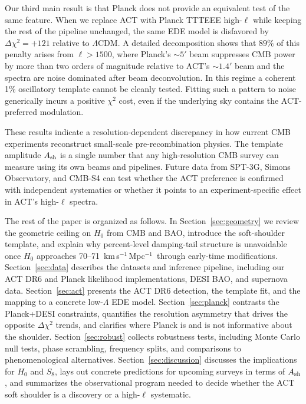 \documentclass[twocolumn,showpacs,preprintnumbers,amsmath,amssymb,prd]{revtex4-2}
\newcommand{\lcdm}{$\Lambda$CDM}
\newcommand{\kms}{km\,s$^{-1}$\,Mpc$^{-1}$}
\begin{document}
Our third main result is that Planck does not provide an equivalent test of the same feature. When we replace ACT with Planck TTTEEE high-$\ell$ while keeping the rest of the pipeline unchanged, the same EDE model is disfavored by $\Delta\chi^2 = +121$ relative to \lcdm. A detailed decomposition shows that $89\%$ of this penalty arises from $\ell > 1500$, where Planck's $\sim 5'$ beam suppresses CMB power by more than two orders of magnitude relative to ACT's $\sim 1.4'$ beam and the spectra are noise dominated after beam deconvolution. In this regime a coherent 1\% oscillatory template cannot be cleanly tested. Fitting such a pattern to noise generically incurs a positive $\chi^2$ cost, even if the underlying sky contains the ACT-preferred modulation.

These results indicate a resolution-dependent discrepancy in how current CMB experiments reconstruct small-scale pre-recombination physics. The template amplitude $A_{\rm sh}$ is a single number that any high-resolution CMB survey can measure using its own beams and pipelines. Future data from SPT-3G, Simons Observatory, and CMB-S4 can test whether the ACT preference is confirmed with independent systematics or whether it points to an experiment-specific effect in ACT's high-$\ell$ spectra.

The rest of the paper is organized as follows. In Section~\ref{sec:geometry} we review the geometric ceiling on $H_0$ from CMB and BAO, introduce the soft-shoulder template, and explain why percent-level damping-tail structure is unavoidable once $H_0$ approaches 70--71~\kms\ through early-time modifications. Section~\ref{sec:data} describes the datasets and inference pipeline, including our ACT DR6 and Planck likelihood implementations, DESI BAO, and supernova data. Section~\ref{sec:act} presents the ACT DR6 detection, the template fit, and the mapping to a concrete low-$\Lambda$ EDE model. Section~\ref{sec:planck} contrasts the Planck+DESI constraints, quantifies the resolution asymmetry that drives the opposite $\Delta\chi^2$ trends, and clarifies where Planck is and is not informative about the shoulder. Section~\ref{sec:robust} collects robustness tests, including Monte Carlo null tests, phase scrambling, frequency splits, and comparisons to phenomenological alternatives. Section~\ref{sec:discussion} discusses the implications for $H_0$ and $S_8$, lays out concrete predictions for upcoming surveys in terms of $A_{\rm sh}$, and summarizes the observational program needed to decide whether the ACT soft shoulder is a discovery or a high-$\ell$ systematic.
\end{document}
